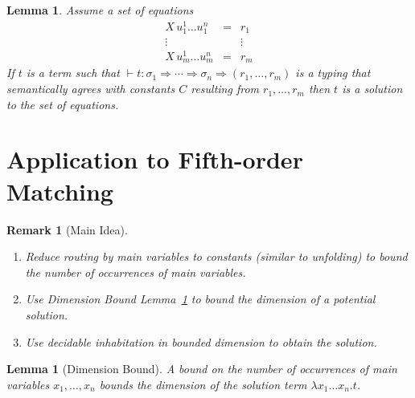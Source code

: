 \documentclass[10pt,a4paper]{article}
\theoremstyle{plain}%
\newtheorem{lemma}[theorem]{Lemma}
\newtheorem{remark}[theorem]{Remark}
\begin{document}
\begin{lemma}
  Assume a set of equations
  \[
    \begin{array}{lll}
      X\,u_1^1\ldots u_1^n &=& r_1\\
      \vdots&&\vdots\\
      X\,u_m^1\ldots u_m^n &=& r_m
    \end{array}
  \]
  If $t$ is a term such that $\vdash t :\sigma_1\Rightarrow\cdots\Rightarrow\sigma_n\Rightarrow(r_1,\ldots,r_m)$ is a typing
  that semantically agrees with constants $C$ resulting from $r_1,\ldots,r_m$ then $t$ is a solution to the set of equations.
\end{lemma}


\newpage

\section{Application to Fifth-order Matching}

\begin{remark}[Main Idea]\leavevmode
\begin{enumerate}
\item Reduce routing by main variables to constants (similar to unfolding) to bound the number of occurrences of main variables.
\item Use Dimension Bound Lemma~\ref{lem:fifth-dim-bound} to bound the dimension of a potential solution.
\item Use decidable inhabitation in bounded dimension to obtain the solution.
\end{enumerate}
\end{remark}

\begin{lemma}[Dimension Bound]\label{lem:fifth-dim-bound}
A bound on the number of occurrences of main variables $x_1, \ldots, x_n$ bounds the dimension of the solution term $\lambda x_1 \ldots x_n.t$.
\end{lemma}
\end{document}
